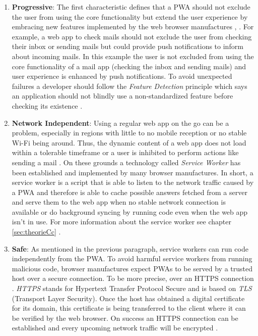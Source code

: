 \begin{enumerate} 
	\item  \textbf{Progressive}: The first characteristic defines that a  \acs{PWA} should not exclude the user from using the core functionality but extend the user experience by embracing new features implemented by the web browser manufactures \cite[p. 100]{liebelProgressiveWebApps2019}, \cite[p. 2]{hajianProgressiveWebApps2019}. For example, a web app to check mails should not exclude the user from checking their inbox or sending mails but could provide push notifications to inform about incoming mails. In this example the user is not excluded from using the core functionality of a mail app (checking the inbox and sending mails) and user experience is enhanced by push notifications. To avoid unexpected failures a developer should follow the \textit{Feature Detection} principle which says an application should not blindly use a non-standardized feature before checking its existence \cite[p. 101]{liebelProgressiveWebApps2019}.

	\item \textbf{Network Independent}: Using a regular web app on the go can be a problem, especially in regions with little to no mobile reception or no stable Wi-Fi being around. Thus, the dynamic content of a web app does not load within a tolerable timeframe or a user is inhibited to perform actions like sending a mail \cite[p. 106]{liebelProgressiveWebApps2019}. On these grounds a technology called \textit{Service Worker} has been established and implemented by many browser manufactures. In short, a service worker is a script that is able to listen to the network traffic caused by a  \acs{PWA} and therefore is able to cache possible answers fetched from a server and serve them to the web app when no stable network connection is available or do background syncing by running code even when the web app isn’t in use. For more information about the service worker see chapter \ref{sec:theorieCc} \cite[p. 43]{sheppardBeginningProgressiveWeb2017}.

	\item \textbf{Safe}: As mentioned in the previous paragraph, service workers can run code independently from the  \acs{PWA}. To avoid harmful service workers from running malicious code, browser manufactures expect  \acs{PWA}s to be served by a trusted host over a secure connection. To be more precise, over an HTTPS connection \cite[p. 24]{sheppardBeginningProgressiveWeb2017}. \textit{HTTPS} stands for Hypertext Transfer Protocol Secure and is based on \textit{TLS} (Transport Layer Security). Once the host has obtained a digital certificate for its domain, this certificate is being transferred to the client where it can be verified by the web browser. On success an HTTPS connection can be established and every upcoming network traffic will be encrypted \cite[pp. 112-113]{liebelProgressiveWebApps2019}.


\end{enumerate}
